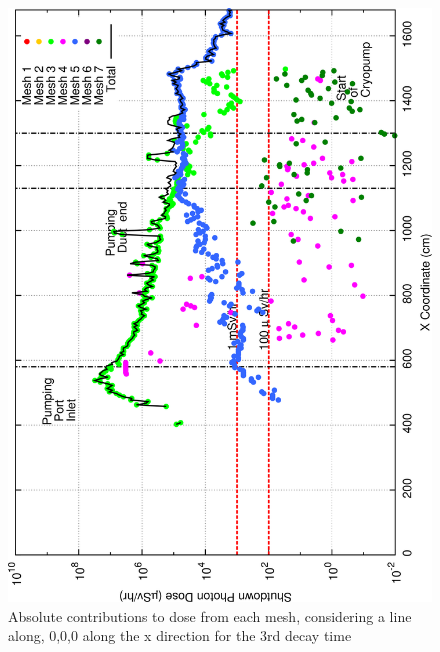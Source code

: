 \documentclass[12pt]{article}
\begin{document}
\begin{figure}[ht!]
\centering
\includegraphics[clip,scale=0.25]{../plots/crosstalk/b4c/lp/dc3.png}
\caption{Absolute contributions to dose from each mesh, considering a line along, 0,0,0 along the x direction for the 3rd decay time}
\label{fig:b4c_ct_lp_dc3}
\end{figure}
\end{document}
